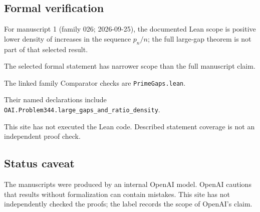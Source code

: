 \documentclass[11pt]{article}
\begin{document}
\subsection{Formal verification}
For manuscript 1 (family 026; 2026-09-25), the documented Lean scope is positive lower density of increases in the sequence $p_n/n$; the full large-gap theorem is not part of that selected result.

The selected formal statement has narrower scope than the full manuscript claim.

The linked family Comparator checks are \texttt{PrimeGaps.lean}.

Their named declarations include \texttt{OAI.Problem344.large\_gaps\_and\_ratio\_density}.

This site has not executed the Lean code. Described statement coverage is not an independent proof check.

\subsection{Status caveat}
The manuscripts were produced by an internal OpenAI model. OpenAI cautions that results without formalization can contain mistakes. This site has not independently checked the proofs; the label records the scope of OpenAI's claim.
\end{document}
